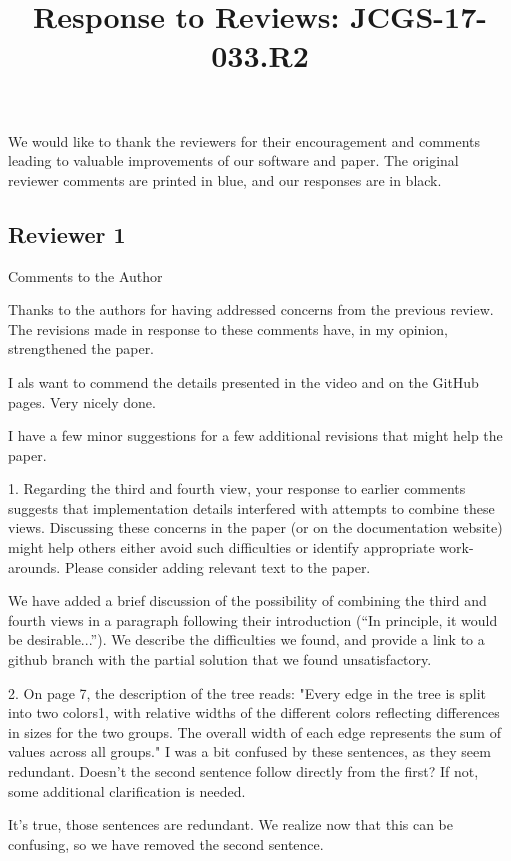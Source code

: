 \documentclass{article}
\title{Response to Reviews: JCGS-17-033.R2}
\begin{document}
\maketitle

We would like to thank the reviewers for their encouragement and comments
leading to valuable improvements of our software and paper. The original
reviewer comments are printed in blue, and our responses are in black.

\subsection{Reviewer 1}
\label{subsec:reviewer_1}

\color{blue}
Comments to the Author

Thanks to the authors for having addressed concerns from the previous review.
The revisions made in response to these comments have, in my opinion,
strengthened the paper.

I als want to commend the details presented in the video and on the GitHub
pages. Very nicely done.

I have a few minor suggestions for a few additional revisions that might help
the paper.

1. Regarding the third and fourth view, your response to earlier comments
suggests that implementation details interfered with attempts to combine these
views. Discussing these concerns in the paper (or on the documentation website)
might help others either avoid such difficulties or identify appropriate
work-arounds. Please consider adding relevant text to the paper.

\color{black}
We have added a brief discussion of the possibility of combining the third and
fourth views in a paragraph following their introduction (``In principle, it
would be desirable...''). We describe the difficulties we found, and provide a
link to a github branch with the partial solution that we found unsatisfactory.

\color{blue}
2. On page 7, the description of the tree reads: "Every edge in the tree is
split into two colors1, with relative widths of the different colors reflecting
differences in sizes for the two groups. The overall width of each edge
represents the sum of values across all groups." I was a bit confused by these
sentences, as they seem redundant. Doesn't the second sentence follow directly
from the first? If not, some additional clarification is needed.

\color{black}
It's true, those sentences are redundant. We realize now that this can be
confusing, so we have removed the second sentence.
\end{document}
